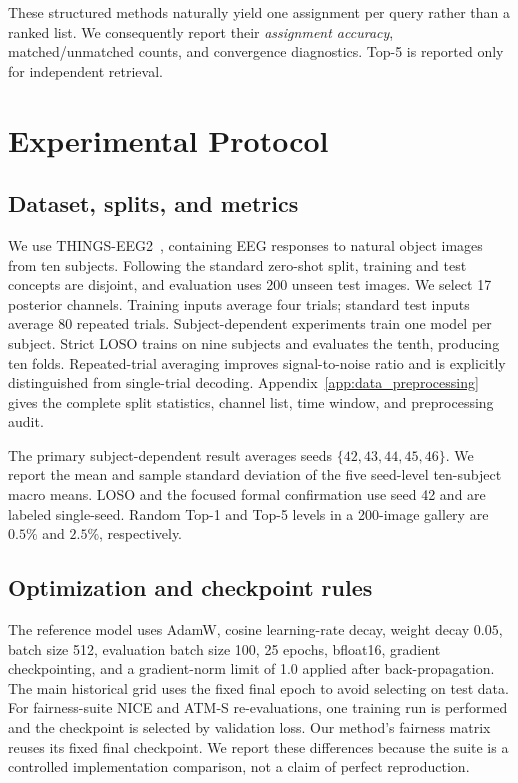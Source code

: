 \documentclass{article}
\begin{document}
These structured methods naturally yield one assignment per query rather than a ranked list. We consequently report their \emph{assignment accuracy}, matched/unmatched counts, and convergence diagnostics. Top-5 is reported only for independent retrieval.

\section{Experimental Protocol}
\label{sec:protocol}

\subsection{Dataset, splits, and metrics}

We use THINGS-EEG2~\citep{gifford2022things}, containing EEG responses to natural object images from ten subjects. Following the standard zero-shot split, training and test concepts are disjoint, and evaluation uses 200 unseen test images. We select 17 posterior channels. Training inputs average four trials; standard test inputs average 80 repeated trials. Subject-dependent experiments train one model per subject. Strict LOSO trains on nine subjects and evaluates the tenth, producing ten folds. Repeated-trial averaging improves signal-to-noise ratio and is explicitly distinguished from single-trial decoding. Appendix~\ref{app:data_preprocessing} gives the complete split statistics, channel list, time window, and preprocessing audit.

The primary subject-dependent result averages seeds $\{42,43,44,45,46\}$. We report the mean and sample standard deviation of the five seed-level ten-subject macro means. LOSO and the focused formal confirmation use seed 42 and are labeled single-seed. Random Top-1 and Top-5 levels in a 200-image gallery are $0.5\%$ and $2.5\%$, respectively.

\subsection{Optimization and checkpoint rules}

The reference model uses AdamW, cosine learning-rate decay, weight decay $0.05$, batch size 512, evaluation batch size 100, 25 epochs, bfloat16, gradient checkpointing, and a gradient-norm limit of 1.0 applied after back-propagation. The main historical grid uses the fixed final epoch to avoid selecting on test data. For fairness-suite NICE and ATM-S re-evaluations, one training run is performed and the checkpoint is selected by validation loss. Our method's fairness matrix reuses its fixed final checkpoint. We report these differences because the suite is a controlled implementation comparison, not a claim of perfect reproduction.
\end{document}
